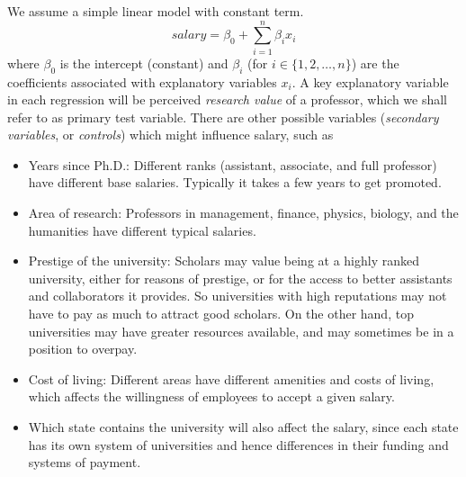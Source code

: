 We assume a simple linear model with constant term.
\begin{equation}
salary = \beta_0 + \sum _{i=1}^{n} \beta_i x_i
\end{equation}
where $\beta_0$ is the intercept (constant) and $\beta_i$ (for $i \in \{1,2,\ldots,n\}$) are the coefficients associated with explanatory variables $x_i$. A key explanatory variable in each regression will be perceived \emph{research value} of a professor, which we shall refer to as primary test variable. There are other possible variables (\emph{secondary variables}, or \emph{controls}) which might influence salary, such as 
\begin{itemize}
\item Years since Ph.D.: Different ranks (assistant, associate, and full professor) have different base salaries. Typically it takes a few years to get promoted.
\item Area of research: Professors in management, finance, physics, biology, and the humanities have different typical salaries.
\item Prestige of the university: Scholars may value being at a highly ranked university, either for reasons of prestige, or for the access to better assistants and collaborators it provides. So universities with high reputations may not have to pay as much to attract good scholars. On the other hand, top universities may have greater resources available, and may sometimes be in a position to overpay.
\item Cost of living: Different areas have different amenities and costs of living, which affects the willingness of employees to accept a given salary.
\item Which state contains the university will also affect the salary, since each state has its own system of universities and hence differences in their funding and systems of payment.
\end{itemize}
